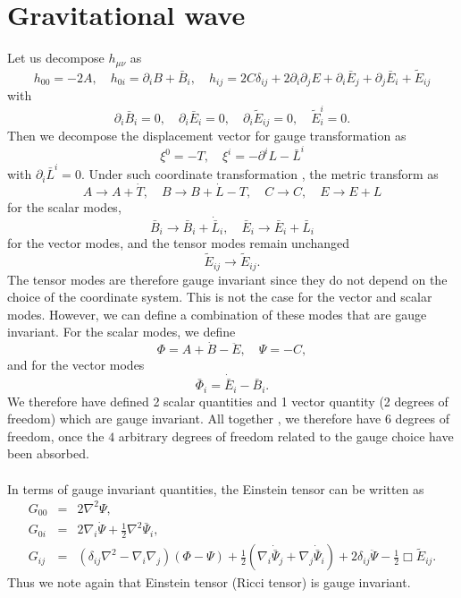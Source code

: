 \section{Gravitational wave}
Let us decompose $h_{\mu\nu}$ as
\[h_{00} = -2A , \quad h_{0i} = \partial_i B + \bar{B}_i , \quad h_{ij} = 2C\delta_{ij} + 2\partial_i\partial_j E + \partial _i\bar{E}_j + \partial_j\bar{E}_i + \tilde{E}_{ij} \]
with
\[\partial_i \bar{B}_i = 0 , \quad \partial_i \bar{E}_i = 0 , \quad \partial_i \tilde{E}_{ij} = 0 , \quad \tilde{E}^i_i = 0.\]
Then we decompose the displacement vector for gauge transformation as
\[\xi^0 = -T , \quad \xi^i = -\partial^i L - \bar{L}^i \]
with $\partial_i \bar{L}^i = 0$. 
Under such coordinate transformation , the metric transform as
\[A \to A + \dot{T} , \quad B \to B + \dot{L} - T , \quad C \to C , \quad E \to E  + L \]
for the scalar modes,
\[\bar{B}_i \to \bar{B}_i + \dot{\bar{L}}_i , \quad \bar{E}_i \to \bar{E}_i + \bar{L}_i \]
for the vector modes, and the tensor modes remain unchanged
\[\tilde{E}_{ij} \to \tilde{E}_{ij}.\]
The tensor modes are therefore gauge invariant since they do not depend on the choice of the coordinate system. This is not the case for the vector and scalar modes. 
However, we can define a combination of these modes that are gauge invariant. For the scalar modes, we define
\[\Phi = A + \dot{B} - \ddot{E} , \quad \Psi = -C, \]
and for the vector modes
\[\bar{\Phi}_i = \dot{\bar{E}}_i - \bar{B}_i.\]
We therefore have defined 2 scalar quantities and 1 vector quantity (2 degrees of freedom) which are gauge invariant. All together , we therefore have $6$ degrees of freedom, once the $4$ arbitrary degrees of freedom related to the gauge choice have been absorbed.
\\ \\
In terms of gauge invariant quantities, the Einstein tensor can be written as
\begin{eqnarray}
G_{00} &=& 2\nabla^2 \Psi, \nonumber \\
G_{0i} &=& 2\nabla_{i} \dot{\Psi} + \frac{1}{2}\nabla^2 \bar{\Psi}_{i}, \nonumber \\
G_{ij} &=& (\delta_{ij}\nabla^2-\nabla_{i} \nabla_{j})(\Phi-\Psi) + \frac{1}{2}\left( \nabla_{i} \dot{\bar{\Psi}}_{j} + \nabla_{j} \dot{\bar{\Psi}}_{i}\right) + 2\delta_{ij}\ddot{\Psi} - \frac{1}{2}\Box \tilde{E}_{ij}. \nonumber
\end{eqnarray}
Thus we note again that Einstein tensor (Ricci tensor) is gauge invariant.
\\ \\
